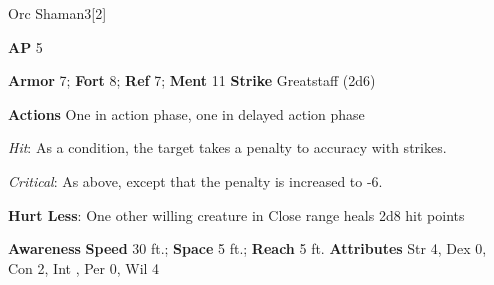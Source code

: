 \begin{monsection}{Orc Shaman}{3}[2]
\vspace{-1em}\vspace{-1em}
\begin{spellcontent}
\begin{spelltargetinginfo}
{\textbf{AP} 5}

\pari \textbf{Armor} 7;
\textbf{Fort} 8;
\textbf{Ref} 7;
\textbf{Ment} 11
\pari \textbf{Strike} Greatstaff  (2d6)


\pari \textbf{Actions} One in action phase, one in delayed action phase
\end{spelltargetinginfo}


\begin{spelleffects}

\pari

\par


\par \textit{Hit}: As a condition, the target takes a  penalty to accuracy with strikes.
\par \textit{Critical}: As above, except that the penalty is increased to -6.

\vspace{0.5em}
\pari
\textbf{Hurt Less}:
One other willing creature in Close range heals 2d8 hit points



\end{spelleffects}

\end{spellcontent}

\begin{monsterfooter}
\pari \textbf{Awareness} 
\pari \textbf{Speed} 30 ft.;
\textbf{Space} 5 ft.;
\textbf{Reach} 5 ft.
\pari \textbf{Attributes}
Str 4,
Dex 0,
Con 2,
Int ,
Per 0,
Wil 4
\end{monsterfooter}
\end{monsection}



